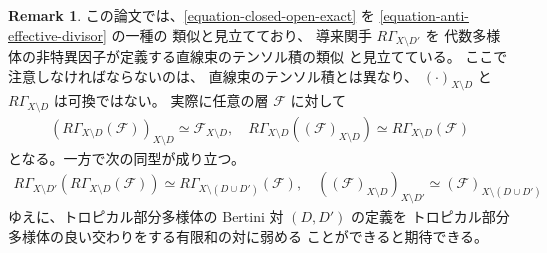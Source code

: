 \documentclass[a4paper,dvipdfmx,reqno,12pt]{amsart}
\theoremstyle{definition}
\newtheorem{remark}[theorem]{Remark}
\newcommand{\deq}{\coloneqq}
\numberwithin{equation}{section}
\begin{document}
\begin{remark}
この論文では、\eqref{equation-closed-open-exact} を
\eqref{equation-anti-effective-divisor} の一種の
類似と見立てており、
導来関手 $R\Gamma_{X\setminus D'}$ を
代数多様体の非特異因子が定義する直線束のテンソル積の類似
と見立てている。
ここで注意しなければならないのは、
直線束のテンソル積とは異なり、
$(\cdot )_{X\setminus D}$
と $R\Gamma_{X\setminus D}$ は可換ではない。
実際に任意の層 $\mathcal{F}$ に対して
\begin{align}
(R\Gamma_{X\setminus D}(\mathcal{F}))_{X\setminus D}
\simeq 
\mathcal{F}_{X\setminus D}, \quad
R\Gamma_{X\setminus D}((\mathcal{F})_{X\setminus D})
\simeq R\Gamma_{X\setminus D}(\mathcal{F})
\end{align}
となる。一方で次の同型が成り立つ。
\begin{align}
R\Gamma_{X\setminus D'}
(R\Gamma_{X\setminus D}(\mathcal{F}))
\simeq R\Gamma_{X\setminus (D\cup D')}(\mathcal{F}), \quad
((\mathcal{F})_{X\setminus D})_{X\setminus D'}
\simeq (\mathcal{F})_{X\setminus (D \cup D')}
\end{align}
ゆえに、トロピカル部分多様体の Bertini 対 $(D,D')$ の定義を
トロピカル部分多様体の良い交わりをする有限和の対に弱める
ことができると期待できる。

\end{remark}

\end{document}
